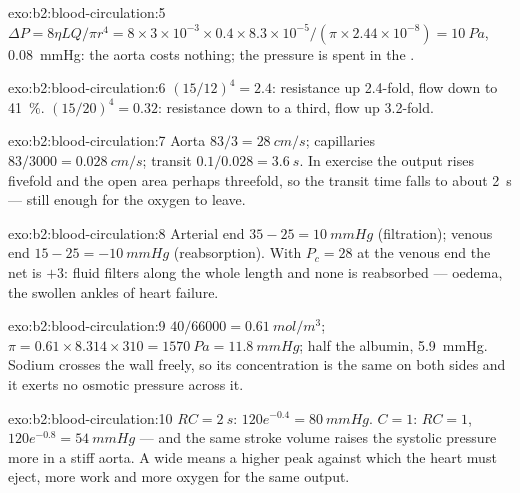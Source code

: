 \begin{solution}{exo:b2:blood-circulation:5}
$\Delta P = 8\eta LQ/\pi r^{4} = 8\times 3\times 10^{-3}\times
0.4\times 8.3\times 10^{-5}/(\pi\times 2.44\times 10^{-8}) =
\qty{10}{Pa}$, \qty{0.08}{mmHg}: the aorta costs nothing; the
pressure is spent in the .
\end{solution}

\begin{solution}{exo:b2:blood-circulation:6}
$(15/12)^{4} = 2.4$: resistance up 2.4-fold, flow down to
\qty{41}{\%}. $(15/20)^{4} = 0.32$: resistance down to a third, flow
up 3.2-fold.
\end{solution}

\begin{solution}{exo:b2:blood-circulation:7}
Aorta $83/3 = \qty{28}{cm/s}$; capillaries $83/3000 =
\qty{0.028}{cm/s}$; transit $0.1/0.028 = \qty{3.6}{s}$. In exercise
the output rises fivefold and the open  area perhaps
threefold, so the transit time falls to about \qty{2}{s} --- still
enough for the oxygen to leave.
\end{solution}

\begin{solution}{exo:b2:blood-circulation:8}
Arterial end $35 - 25 = \qty{+10}{mmHg}$ (filtration); venous end $15
- 25 = \qty{-10}{mmHg}$ (reabsorption). With $P_c = 28$ at the venous
end the net is $+3$: fluid filters along the whole length and none
is reabsorbed --- oedema, the swollen ankles of heart failure.
\end{solution}

\begin{solution}{exo:b2:blood-circulation:9}
$40/66000 = \qty{0.61}{mol/m^3}$; $\pi = 0.61\times 8.314\times 310 =
\qty{1570}{Pa} = \qty{11.8}{mmHg}$; half the albumin, \qty{5.9}{mmHg}.
Sodium crosses the  wall freely, so its concentration is the
same on both sides and it exerts no osmotic pressure across it.
\end{solution}

\begin{solution}{exo:b2:blood-circulation:10}
$RC = \qty{2}{s}$: $120e^{-0.4} = \qty{80}{mmHg}$. $C = 1$: $RC = 1$,
$120e^{-0.8} = \qty{54}{mmHg}$ --- and the same stroke volume raises
the systolic pressure more in a stiff aorta. A wide 
means a higher peak against which the heart must eject, more work
and more oxygen for the same output.
\end{solution}


